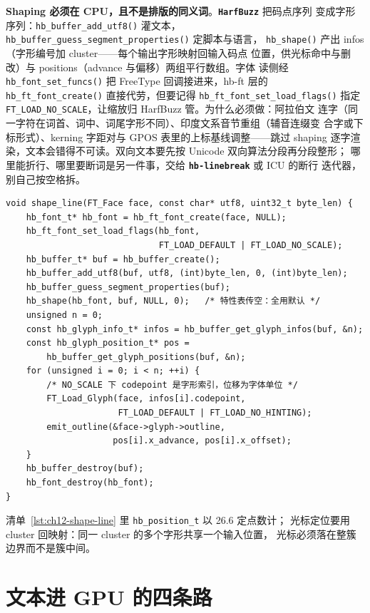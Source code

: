\documentclass[12pt,a4paper,fontset=fandol]{ctexbook}
\newcommand{\Fn}[1]{\texttt{#1()}}
\newcommand{\Tp}[1]{\texttt{#1}}
\newcommand{\Bk}{\discretionary{}{}{}}
\newcommand{\Lib}[1]{\textbf{\texttt{#1}}}
\begin{document}
\textbf{Shaping 必须在 CPU，且不是排版的同义词}。\Lib{HarfBuzz} 把码点序列
变成字形序列：\Fn{hb\_buffer\_add\_utf8} 灌文本，
\Fn{hb\_buffer\Bk\_guess\Bk\_segment\Bk\_properties} 定脚本与语言，
\Fn{hb\_shape} 产出 infos（字形编号加 cluster——每个输出字形映射回输入码点
位置，供光标命中与删改）与 positions（advance 与偏移）两组平行数组。字体
读侧经 \Fn{hb\_font\_set\_funcs} 把 FreeType 回调接进来，hb-ft 层的
\Fn{hb\_ft\_font\_create} 直接代劳，但要记得 \Fn{hb\_ft\_font\Bk\_set\Bk\_load\_flags}
指定 \Tp{FT\_LOAD\_NO\_SCALE}，让缩放归 HarfBuzz 管。为什么必须做：阿拉伯文
连字（同一字符在词首、词中、词尾字形不同）、印度文系音节重组（辅音连缀变
合字或下标形式）、kerning 字距对与 GPOS 表里的上标基线调整——跳过 shaping
逐字渲染，文本会错得不可读。双向文本要先按 Unicode 双向算法分段再分段整形；
哪里能折行、哪里要断词是另一件事，交给 \Lib{hb-linebreak} 或 ICU 的断行
迭代器，别自己按空格拆。

\begin{lstlisting}[style=cstyle,label={lst:ch12-shape-line},caption={HarfBuzz 整形一行文本并逐字形经 FreeType 取轮廓}]
void shape_line(FT_Face face, const char* utf8, uint32_t byte_len) {
    hb_font_t* hb_font = hb_ft_font_create(face, NULL);
    hb_ft_font_set_load_flags(hb_font,
                              FT_LOAD_DEFAULT | FT_LOAD_NO_SCALE);
    hb_buffer_t* buf = hb_buffer_create();
    hb_buffer_add_utf8(buf, utf8, (int)byte_len, 0, (int)byte_len);
    hb_buffer_guess_segment_properties(buf);
    hb_shape(hb_font, buf, NULL, 0);   /* 特性表传空：全用默认 */
    unsigned n = 0;
    const hb_glyph_info_t* infos = hb_buffer_get_glyph_infos(buf, &n);
    const hb_glyph_position_t* pos =
        hb_buffer_get_glyph_positions(buf, &n);
    for (unsigned i = 0; i < n; ++i) {
        /* NO_SCALE 下 codepoint 是字形索引，位移为字体单位 */
        FT_Load_Glyph(face, infos[i].codepoint,
                      FT_LOAD_DEFAULT | FT_LOAD_NO_HINTING);
        emit_outline(&face->glyph->outline,
                     pos[i].x_advance, pos[i].x_offset);
    }
    hb_buffer_destroy(buf);
    hb_font_destroy(hb_font);
}
\end{lstlisting}

清单~\ref{lst:ch12-shape-line} 里 \Tp{hb\_position\_t} 以 26.6 定点数计；
光标定位要用 cluster 回映射：同一 cluster 的多个字形共享一个输入位置，
光标必须落在整簇边界而不是簇中间。

\section{文本进 GPU 的四条路}
\label{sec:ch12-text-to-gpu}
\end{document}
